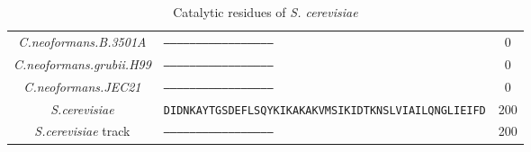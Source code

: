 \begin{table}[htp]
\begin{tabular}{|c|l|c|}
\\
\hline
\textit{C.neoformans.B.3501A} & \texttt{--------------------------------------------------} & 0
\\
\textit{C.neoformans.grubii.H99} & \texttt{--------------------------------------------------} & 0
\\
\textit{C.neoformans.JEC21} & \texttt{--------------------------------------------------} & 0
\\
\textit{S.cerevisiae} & \texttt{DIDNKAYTGSDEFLSQYKIKAKAKVMSIKIDTKNSLVIAILQNGLIEIFD} & 200
\\
\textit{S.cerevisiae} track & \texttt{--------------------------------------------------} & 200
\\
\hline
\end{tabular}
\caption{Catalytic residues of \textit{S. cerevisiae}}
\label{tab:active0}
\end{table} \FloatBarrier
